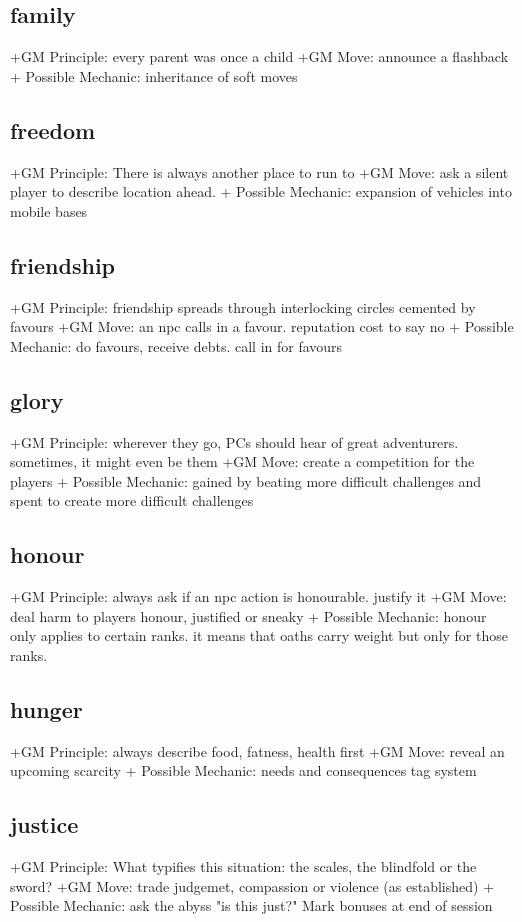 \documentclass{tufte-handout}
\begin{document}
\begin{multicols}{2}
\subsection{family}
+GM Principle: every parent was once a child
+GM Move: 	announce a flashback
+ Possible Mechanic: 	inheritance of soft moves

\subsection{freedom}
+GM Principle:  There is always another place to run to
+GM Move:  ask a silent player to describe location ahead.
+ Possible Mechanic: expansion of vehicles into mobile bases 

\subsection{friendship}
+GM Principle: friendship spreads through interlocking circles cemented by favours
+GM Move: an npc calls in a favour. reputation cost to say no 
+ Possible Mechanic: do favours, receive debts. call in for favours
		
\subsection{glory}
+GM Principle: wherever they go, PCs should hear of great adventurers. sometimes, it might even be them
+GM Move: create a competition for the players
+ Possible Mechanic: gained by beating more difficult challenges and spent to create more difficult challenges  

\subsection{honour}
+GM Principle: always ask if an npc action is honourable. justify it
+GM Move: deal harm to players honour, justified or sneaky
+ Possible Mechanic: honour only applies to certain ranks. it means that oaths carry weight but only for those ranks.

\subsection{hunger}
+GM Principle:  always describe food, fatness, health first
+GM Move:   reveal an upcoming scarcity
+ Possible Mechanic: needs and consequences tag system

\subsection{justice}
+GM Principle: What typifies this situation: the scales, the blindfold or the sword?	
+GM Move: trade judgemet, compassion or violence (as established)
+ Possible Mechanic: ask the abyss "is this just?" Mark bonuses at end of session 


\end{multicols}
\end{document}
